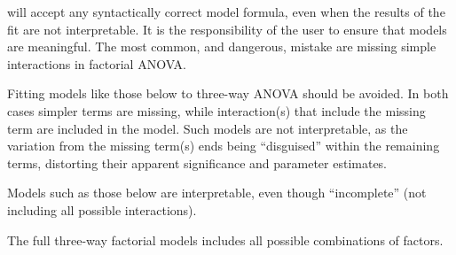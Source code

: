 \documentclass[krantz2]{krantz}\usepackage{knitr}%
\begin{document}
\begin{warningbox}
  \Rlang will accept any syntactically correct model formula, even when the results of the fit are not interpretable. It is the responsibility of the user to ensure that models are meaningful. The most common, and dangerous, mistake are missing simple interactions in factorial ANOVA.

  Fitting models like those below to three-way ANOVA should be avoided. In both cases simpler terms are missing, while interaction(s) that include the missing term are included in the model. Such models are not interpretable, as the variation from the missing term(s) ends being ``disguised'' within the remaining terms, distorting their apparent significance and parameter estimates.

\begin{knitrout}\footnotesize
{}\color{fgcolor}\begin{kframe}
\begin{alltt}
 \hlopt{~}  \hlopt{+}  \hlopt{+}  \hlopt{*}  \hlopt{+}  \hlopt{*}  \hlopt{+}  \hlopt{*} 
 \hlopt{~}  \hlopt{+}  \hlopt{+}  \hlopt{+}  \hlopt{*}  \hlopt{*} 
\end{alltt}
\end{kframe}
\end{knitrout}

  Models such as those below are interpretable, even though ``incomplete'' (not including all possible interactions).

\begin{knitrout}\footnotesize
{}\color{fgcolor}\begin{kframe}
\begin{alltt}
 \hlopt{~}  \hlopt{+}  \hlopt{+}  \hlopt{+}  \hlopt{*}  \hlopt{+}  \hlopt{*}  \hlopt{+}  \hlopt{*} 
 \hlopt{~}  \hlopt{+}  \hlopt{+}  \hlopt{+}  \hlopt{*} 
\end{alltt}
\end{kframe}
\end{knitrout}

  The full three-way factorial models includes all possible combinations of factors.

\begin{knitrout}\footnotesize
{}\color{fgcolor}\begin{kframe}
\begin{alltt}
 \hlopt{~}  \hlopt{+}  \hlopt{+}  \hlopt{+}  \hlopt{*}  \hlopt{+}  \hlopt{*}  \hlopt{+}  \hlopt{*}  \hlopt{+}  \hlopt{*}  \hlopt{*} 
\end{alltt}
\end{kframe}
\end{knitrout}

\end{warningbox}
\end{document}
